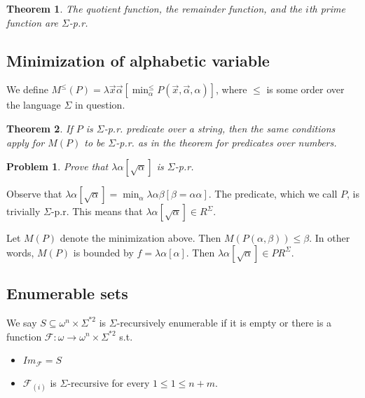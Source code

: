 \documentclass[a4paper, 12pt]{article}
\newtheorem{problem}{Problem}
\newtheorem{theorem}{Theorem}
\newtheorem{problem}{Problem}
\newtheorem{theorem}{Theorem}
\begin{document}
\begin{theorem}
    The quotient function, the remainder function, and the $i$th prime function are $\Sigma$-p.r.
\end{theorem}

\subsection{Minimization of alphabetic variable}

We define $M^{\leq}(P) = \lambda \overrightarrow{x} \overrightarrow{\alpha}
\left[ \min_{\alpha}^{\leq} P(\overrightarrow{x}, \overrightarrow{\alpha},
\alpha) \right] $, where $\leq$ is some order over the language $\Sigma$ in
question.

\begin{theorem}
    If $P$ is $\Sigma$-p.r. predicate over a string, then the same conditions
    apply for $M(P)$ to be $\Sigma$-p.r. as in the theorem for predicates over
    numbers.
\end{theorem}

\begin{problem}
    Prove that $\lambda \alpha[\sqrt{\alpha} ]$ is $\Sigma$-p.r.
\end{problem}

Observe that $\lambda \alpha \left[ \sqrt{\alpha}  \right] = \min_{\alpha}
\lambda \alpha \beta [\beta = \alpha \alpha]$. The predicate, which we call $P$,
is trivially $\Sigma$-p.r. This means that $\lambda \alpha[\sqrt{ \alpha } ] \in
R^{\Sigma}$. 

Let $M(P)$ denote the minimization above. Then $M\left(P\left(\alpha,
\beta\right)\right) \leq \beta$. In other words, $M(P)$ is bounded by $f =
\lambda \alpha [\alpha]$. Then $\lambda \alpha [\sqrt{\alpha} ] \in
PR^{\Sigma}$.


\subsection{Enumerable sets}

We say $S \subseteq \omega^n \times \Sigma^{*2}$ is $\Sigma$-recursively
enumerable if it is empty or there is a function $\mathcal{F} : \omega \to
\omega^n \times \Sigma^{*2}$ s.t.

\begin{itemize}
    \item $Im_{\mathcal{F}} = S$ 
    \item $\mathcal{F}_{(i)}$ is $\Sigma$-recursive for every $1 \leq 1 \leq n + m$.
\end{itemize}
\end{document}
